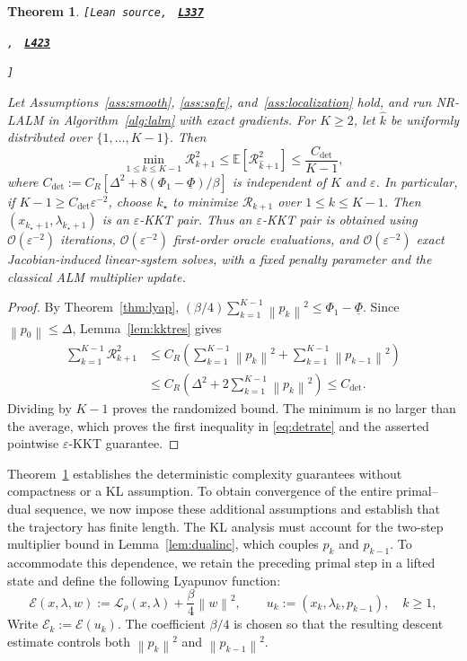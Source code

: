 \documentclass[11pt]{article}
\newtheorem{theorem}{Theorem}[section]
\theoremstyle{definition}
\theoremstyle{remark}
\numberwithin{equation}{section}
\numberwithin{figure}{section}
\numberwithin{table}{section}
\numberwithin{algorithm}{section}
\newcommand{\E}{\mathbb{E}}
\newcommand{\cL}{\mathcal{L}}
\newcommand{\cO}{\mathcal{O}}
\newcommand{\eps}{\varepsilon}
\newcommand{\norm}[1]{\left\lVert #1\right\rVert}
\newcommand{\leanLinkText}[1]{%
  \underline{\textbf{#1}}%
}
\newcommand{\leanDeclTag}[2]{%
  {\footnotesize\texttt{[Lean source, }}%
  \href{https://github.com/optpku/ReasBook/blob/v4.32.2/ReasBook/Papers/TR_LALM_theory/#1?plain=1\#L#2}%
    {\leanLinkText{\footnotesize\texttt{L#2}}}%
}
\newcommand{\leanDeclTagExtra}[2]{%
  \unskip
  {\footnotesize\texttt{, }}%
  \href{https://github.com/optpku/ReasBook/blob/v4.32.2/ReasBook/Papers/TR_LALM_theory/#1?plain=1\#L#2}%
    {\leanLinkText{\footnotesize\texttt{L#2}}}\allowbreak
}
\newcommand{\leanDeclTagEnd}{%
  \unskip
  {\footnotesize\texttt{]}}\enspace
}
\begin{document}
\begin{theorem}
\label{thm:det}
\leanDeclTag{Theorem_2_12.lean}{337}
\leanDeclTagExtra{Theorem_2_12.lean}{423}
\leanDeclTagEnd
Let Assumptions~\ref{ass:smooth}, \ref{ass:safe}, and~\ref{ass:localization}
hold, and run NR-LALM in Algorithm~\ref{alg:lalm} with exact gradients.  For
\(K\ge2\), let
\(\widehat{k}\) be uniformly distributed over \(\{1,\ldots,K-1\}\).  Then
\begin{equation}
    \min_{1\le k\le K-1}\mathcal R_{k+1}^2
    \le \E[\mathcal{R}_{\widehat{k}+1}^2]
    \le \frac{C_{\mathrm{det}}}{K-1},
    \label{eq:detrate}
\end{equation}
where
\(C_{\mathrm{det}}
:=C_R[\Delta^2+8(\Phi_1-\underline\Phi)/\beta]\)
is independent of \(K\) and \(\eps\).  In particular, if
\(K-1\ge C_{\mathrm{det}}\eps^{-2}\), choose \(k_\star\) to minimize
\(\mathcal R_{k+1}\) over \(1\le k\le K-1\).  Then
\((x_{k_\star+1},\lambda_{k_\star+1})\) is an \(\eps\)-KKT pair.  Thus
an \(\eps\)-KKT pair is obtained using \(\cO(\eps^{-2})\) iterations,
\(\cO(\eps^{-2})\) first-order oracle evaluations, and
\(\cO(\eps^{-2})\) exact Jacobian-induced linear-system solves, with a fixed
penalty parameter and the classical ALM multiplier update.
\end{theorem}

\begin{proof}
By Theorem~\ref{thm:lyap},
\((\beta/4)\sum_{k=1}^{K-1}\norm{p_k}^2
\le \Phi_1-\underline\Phi\).
Since \(\norm{p_0}\le\Delta\), Lemma~\ref{lem:kktres} gives
\begin{align*}
    \sum_{k=1}^{K-1}\mathcal{R}_{k+1}^2
    &\le C_R\left(
       \sum_{k=1}^{K-1}\norm{p_k}^2
       +\sum_{k=1}^{K-1}\norm{p_{k-1}}^2\right)\\
    &\le C_R\left(\Delta^2+
       2\sum_{k=1}^{K-1}\norm{p_k}^2\right)
    \le C_{\mathrm{det}}.
\end{align*}
Dividing by \(K-1\) proves the randomized bound.  The minimum is no
larger than the average, which proves the first inequality in
\eqref{eq:detrate} and the asserted pointwise \(\eps\)-KKT guarantee.
\end{proof}

Theorem~\ref{thm:det} establishes the deterministic complexity guarantees without compactness or a KL assumption.  To obtain convergence of the entire primal--dual sequence, we now impose these additional assumptions and establish that the trajectory has finite length.  The KL analysis must account for the two-step multiplier bound in Lemma~\ref{lem:dualinc}, which couples $p_k$ and
$p_{k-1}$.  To accommodate this dependence, we retain the preceding primal step in a lifted state and define the following Lyapunov function:
\begin{equation}
    \mathcal E(x,\lambda,w)
    :=
    \cL_\rho(x,\lambda)
    +\frac{\beta}{4}\norm{w}^2,
    \qquad
    u_k:=(x_k,\lambda_k,p_{k-1}),
    \quad k\geq1,
    \label{eq:KLenergy}
\end{equation}
Write $\mathcal E_k:=\mathcal E(u_k)$.  The coefficient $\beta/4$ is chosen so that the resulting descent estimate controls both
$\norm{p_k}^2$ and $\norm{p_{k-1}}^2$.
\end{document}
